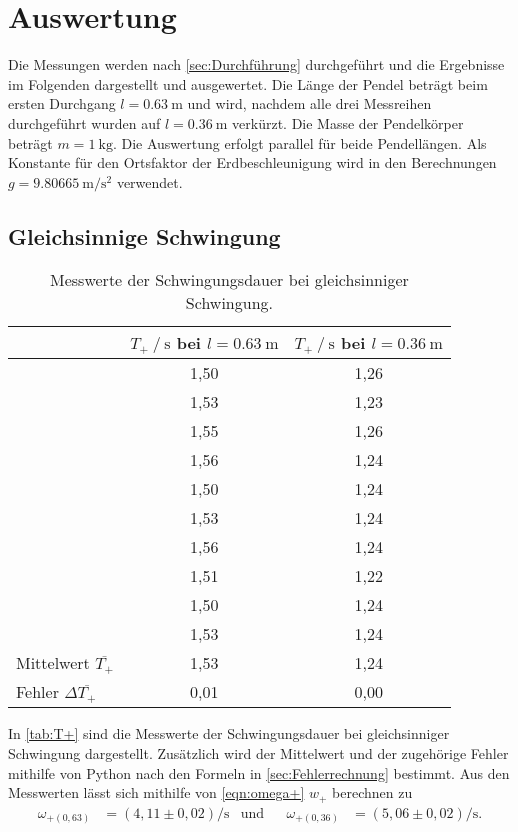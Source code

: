\section{Auswertung}
\label{sec:Auswertung}

Die Messungen werden nach \autoref{sec:Durchführung} durchgeführt und die Ergebnisse im Folgenden dargestellt und ausgewertet.
Die Länge der Pendel beträgt beim ersten Durchgang $l=\qty{0.63}{\meter}$ und wird, nachdem alle drei Messreihen durchgeführt wurden auf 
$l=\qty{0.36}{\meter}$ verkürzt. Die Masse der Pendelkörper beträgt $m=\qty{1}{\kilo\gram}$. 
Die Auswertung erfolgt parallel für beide Pendellängen.
Als Konstante für den Ortsfaktor der Erdbeschleunigung wird in den Berechnungen $g =\qty{9.80665}{\meter\per\second\squared}$
verwendet.

\subsection{Gleichsinnige Schwingung}
\label{subsec:aus_gleich}

\begin{table}[H]
  \centering
  \caption{Messwerte der Schwingungsdauer bei gleichsinniger Schwingung.}
  \label{tab:T+}
  \begin{tabular}{l S S}
    \toprule
     & {$T_+ \mathbin{/} \si{\second}$ bei $l=\qty{0.63}{\meter}$} & {$T_+ \mathbin{/} \si{\second}$ bei $l=\qty{0.36}{\meter}$}\\
    \midrule
      &1,50 & 1,26\\
      &1,53 & 1,23\\
      &1,55 & 1,26\\
      &1,56 & 1,24\\
      &1,50 & 1,24\\
      &1,53 & 1,24\\
      &1,56 & 1,24\\
      &1,51 & 1,22\\
      &1,50 & 1,24\\
      &1,53 & 1,24\\
    \midrule
      Mittelwert $\overline{T_+}$& 1,53 & 1,24\\
      Fehler $\Delta \overline{T_+}$& 0,01 & 0,00\\
    \bottomrule
  \end{tabular}
\end{table}
In \autoref{tab:T+} sind die Messwerte der Schwingungsdauer bei gleichsinniger Schwingung dargestellt. Zusätzlich wird der Mittelwert und der zugehörige
Fehler mithilfe von Python nach den Formeln in \autoref{sec:Fehlerrechnung} bestimmt.
Aus den Messwerten lässt sich mithilfe von \autoref{eqn:omega+} $w_+$ berechnen zu 
\begin{align*}
  \omega_{+(0,63)}&=(4,11 \pm 0,02) \si{\per\second} & \text{und} && \omega_{+(0,36)}&=(5,06 \pm 0,02) \si{\per\second}.
\end{align*}

